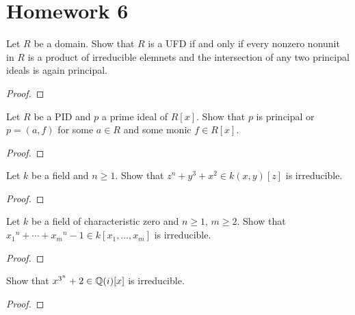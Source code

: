 \chapter{Homework 6}
\begin{problem}
Let $R$ be a domain. Show that $R$ is a UFD if and only if every nonzero
nonunit in $R$ is a product of irreducible elemnets and the intersection of
any two principal ideals is again principal.
\end{problem}
\begin{proof}
\end{proof}

\begin{problem}
Let $R$ be a PID and $p$ a prime ideal of $R[x]$. Show that $p$ is
principal or $p=(a,f)$ for some $a\in R$ and some monic $f\in R[x]$.
\end{problem}
\begin{proof}
\end{proof}

\begin{problem}
Let $k$ be a field and $n\geq 1$. Show that $z^n+y^3+x^2\in k(x,y)[z]$ is
irreducible.
\end{problem}
\begin{proof}
\end{proof}

\begin{problem}
Let $k$ be a field of characteristic zero and $n\geq 1$, $m\geq 2$. Show
that ${x_1}^n+\dotsb+{x_m}^n-1\in k[x_1,\dotsc,x_m]$ is irreducible.
\end{problem}
\begin{proof}
\end{proof}

\begin{problem}
Show that $x^{3^n}+2\in\mathbb{Q}(i)[x]$ is irreducible.
\end{problem}
\begin{proof}
\end{proof}

